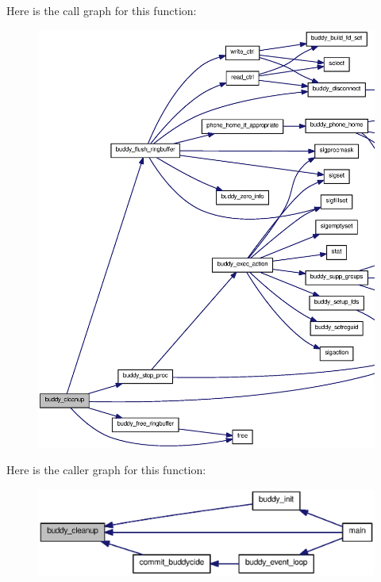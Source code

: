 Here is the call graph for this function:
\nopagebreak
\begin{figure}[H]
\begin{center}
\leavevmode
\includegraphics[width=400pt]{buddy_8h_ae71e6bfc3369a9182bd124873f3c4c54_cgraph}
\end{center}
\end{figure}




Here is the caller graph for this function:\nopagebreak
\begin{figure}[H]
\begin{center}
\leavevmode
\includegraphics[width=400pt]{buddy_8h_ae71e6bfc3369a9182bd124873f3c4c54_icgraph}
\end{center}
\end{figure}


